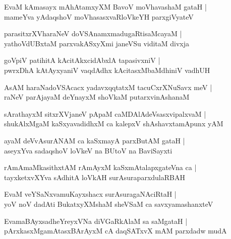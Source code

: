 \documentclass[twoside,12pt,openright]{book}
\newcounter{shloka}[chapter]
\begin{document}
\begin{shloka}%
EvaM kAmasayx mAhAtamxyXM BavoV moVhavashaM gataH |\\
mameYva yAdaqshoV moVhasasxvaRloVkeYH parxgiVyateV
\end{shloka}

\begin{shloka}%
parasitxrXVharaNeV doVSAnamxmadugaRtisaMcayaM |\\
yathoVdUBxtaM parxvakASxyXmi janeVSu viditaM divxja
\end{shloka}

\begin{shloka}%
goVpiV patihitA kAcitAkxcidAbxlA tapasivxniV |\\
pwrxDhA kAtAyxyaniV vaqdAdhx kAcitasxMbaMdhiniV vadhUH 
\end{shloka}

\begin{shloka}%
AsAM haraNadoVSAcacx yadavxqqtatxM tacuCxrXNuSavx meV |\\
raNeV parAjayaM deYnayxM shoVkaM putarxvinAshanaM 
\end{shloka}

\begin{shloka}%
sArathayxM sitxrXVjaneV pApaM caMDAlAdeVsasxvipalxvaM |\\
shukAlxMgaM kaSxyavadidhxM ca kalepxV shAshavxtamApunx yAM
\end{shloka}

\begin{shloka}%
ayaM deVvAsurANAM ca kaSxmayA parxButAM gataH |\\
aseyxYva sadaqshoV loVkeV na BUtoV na BaviSayxti 
\end{shloka}

\begin{shloka}%
rAmAmaMkasithxtAM rAmAyxM kaSxmAtalapxgateVna ca |\\
tayxketxvXYva sAdhitA loVkAH surAsuraparxdulaRBAH 
\end{shloka}

\begin{shloka}%
EvaM veYSaNxvamuKayxshacx surAsuragaNAciRtaH |\\
yoV noV dadAti BukatxyXMshaM sheVSaM ca savxyamashanxteV 
\end{shloka}

\begin{shloka}%
EvamaBAyxsadheYreyxVNa diVGaRkAlaM sa saMgataH |\\
pArxkasxMgamAtasxBArAyxM cA daqSATxvX mAM parxdadw mudA 
\end{shloka}
\end{document}
